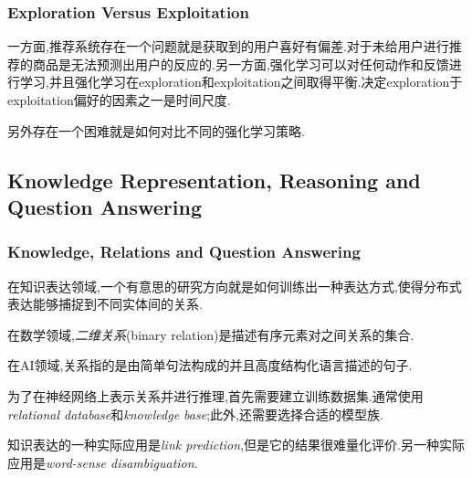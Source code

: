 \subsubsection{Exploration Versus Exploitation}

一方面,推荐系统存在一个问题就是获取到的用户喜好有偏差.对于未给用户进行推荐的商品是无法预测出用户的反应的.另一方面,强化学习可以对任何动作和反馈进行学习,并且强化学习在exploration和exploitation之间取得平衡.决定exploration于exploitation偏好的因素之一是时间尺度.

另外存在一个困难就是如何对比不同的强化学习策略.

\subsection{Knowledge Representation, Reasoning and Question Answering}

\subsubsection{Knowledge, Relations and Question Answering}

在知识表达领域,一个有意思的研究方向就是如何训练出一种表达方式,使得分布式表达能够捕捉到不同实体间的关系.

在数学领域,\textit{二维关系}(binary relation)是描述有序元素对之间关系的集合.

在AI领域,关系指的是由简单句法构成的并且高度结构化语言描述的句子.

为了在神经网络上表示关系并进行推理,首先需要建立训练数据集.通常使用\textit{relational database}和\textit{knowledge base};此外,还需要选择合适的模型族.

知识表达的一种实际应用是\textit{link prediction},但是它的结果很难量化评价.另一种实际应用是\textit{word-sense disambiguation}.